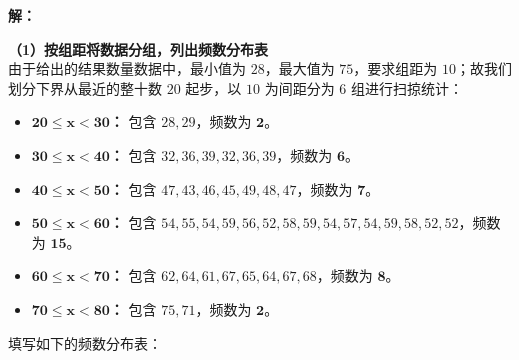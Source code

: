 \vspace{0.4cm}

\textbf{解：}

\textbf{（1）按组距将数据分组，列出频数分布表} \\
由于给出的结果数量数据中，最小值为 $28$，最大值为 $75$，要求组距为 $10$；故我们划分下界从最近的整十数 $20$ 起步，以 $10$ 为间距分为 $6$ 组进行扫掠统计：
\begin{itemize}
  \item \textbf{$\boldsymbol{20 \leqslant x < 30}$：} 包含 $28, 29$，频数为 $\boldsymbol{2}$。
  \item \textbf{$\boldsymbol{30 \leqslant x < 40}$：} 包含 $32, 36, 39, 32, 36, 39$，频数为 $\boldsymbol{6}$。
  \item \textbf{$\boldsymbol{40 \leqslant x < 50}$：} 包含 $47, 43, 46, 45, 49, 48, 47$，频数为 $\boldsymbol{7}$。
  \item \textbf{$\boldsymbol{50 \leqslant x < 60}$：} 包含 $54, 55, 54, 59, 56, 52, 58, 59, 54, 57, 54, 59, 58, 52, 52$，频数为 $\boldsymbol{15}$。
  \item \textbf{$\boldsymbol{60 \leqslant x < 70}$：} 包含 $62, 64, 61, 67, 65, 64, 67, 68$，频数为 $\boldsymbol{8}$。
  \item \textbf{$\boldsymbol{70 \leqslant x < 80}$：} 包含 $75, 71$，频数为 $\boldsymbol{2}$。
\end{itemize}

填写如下的频数分布表：

\vspace{0.4cm}
\begin{center}
\renewcommand{\arraystretch}{1.6}
\end{center}

